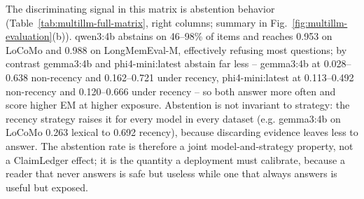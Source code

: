 The discriminating signal in this matrix is abstention behavior (Table~\ref{tab:multillm-full-matrix}, right columns; summary in Fig.~\ref{fig:multillm-evaluation}(b)). qwen3:4b abstains on 46--98\% of items and reaches 0.953 on LoCoMo and 0.988 on LongMemEval-M, effectively refusing most questions; by contrast gemma3:4b and phi4-mini:latest abstain far less -- gemma3:4b at 0.028--0.638 non-recency and 0.162--0.721 under recency, phi4-mini:latest at 0.113--0.492 non-recency and 0.120--0.666 under recency -- so both answer more often and score higher EM at higher exposure. Abstention is not invariant to strategy: the recency strategy raises it for every model in every dataset (e.g. gemma3:4b on LoCoMo 0.263 lexical to 0.692 recency), because discarding evidence leaves less to answer. The abstention rate is therefore a joint model-and-strategy property, not a ClaimLedger effect; it is the quantity a deployment must calibrate, because a reader that never answers is safe but useless while one that always answers is useful but exposed.

